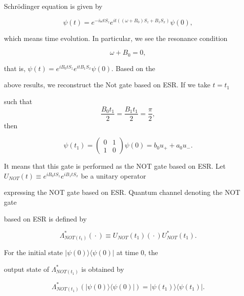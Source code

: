 Schr\"odinger equation is given by 

\[

\psi (t)=e^{-i\omega tS_{z}}e^{it((\omega +B_{0})S_{z}+B_{1}S_{x})}\psi (0), 

\]%

which means time evolution. In particular, we see the resonance condition 

\[

\omega +B_{0}=0, 

\]%

that is, $\psi (t)=e^{iB_{0}tS_{z}}e^{itB_{1}S_{x}}\psi (0)$. Based on the

above results, we reconstruct the Not gate based on ESR. If we take $t=t_{1}$

such that $$\frac{B_{0}t_{1}}{2}=\frac{B_{1}t_{1}}{2}=\frac{\pi }{2},$$ then 

\[

\psi (t_{1})=\left( 

\begin{array}{ll}

0 & 1 \\ 

1 & 0%

\end{array}%

\right) \psi (0)=b_{0}u_{+}+a_{0}u_{-} .

\]%

It means that this gate is performed as the NOT gate based on ESR. Let $%

U_{NOT}(t)\equiv e^{iB_{0}tS_{z}}e^{iB_{1}tS_{x}}$ be a unitary operator

expressing the NOT gate based on ESR. Quantum channel denoting the NOT gate

based on ESR is defined by 

\[

\Lambda _{NOT(t_{1})}^{\ast }({}\cdot{} )\equiv U_{NOT}(t_{1})({}\cdot{}

)U_{NOT}^{\ast }(t_{1}). 

\]%

For the initial state $|\psi (0)\rangle \langle \psi (0)|$ at time $0$, the

output state of $\Lambda _{NOT(t_{1})}^{\ast }$ is obtained by 

\[

\Lambda _{NOT(t_{1})}^{\ast }(|\psi (0)\rangle \langle \psi (0)|)=|\psi

(t_{1})\rangle \langle \psi (t_{1})|. 

\]



